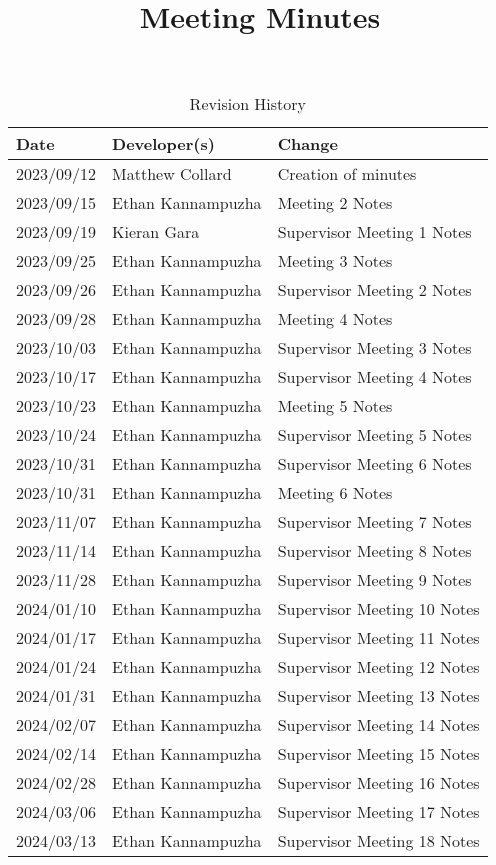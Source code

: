 \documentclass{article}
\title{Meeting Minutes\\\progname}
\author{\authname}
\date{}
\begin{document}
\maketitle

\begin{table}[hp]
\caption{Revision History} \label{TblRevisionHistory}
\begin{tabularx}{\textwidth}{llX}
\toprule
\textbf{Date} & \textbf{Developer(s)} & \textbf{Change}\\
\midrule
2023/09/12 & Matthew Collard & Creation of minutes\\
2023/09/15 & Ethan Kannampuzha & Meeting 2 Notes\\
2023/09/19 & Kieran Gara & Supervisor Meeting 1 Notes\\
2023/09/25 & Ethan Kannampuzha & Meeting 3 Notes\\
2023/09/26 & Ethan Kannampuzha & Supervisor Meeting 2 Notes\\
2023/09/28 & Ethan Kannampuzha & Meeting 4 Notes\\
2023/10/03 & Ethan Kannampuzha & Supervisor Meeting 3 Notes\\
2023/10/17 & Ethan Kannampuzha & Supervisor Meeting 4 Notes\\
2023/10/23 & Ethan Kannampuzha & Meeting 5 Notes\\
2023/10/24 & Ethan Kannampuzha & Supervisor Meeting 5 Notes\\
2023/10/31 & Ethan Kannampuzha & Supervisor Meeting 6 Notes\\
2023/10/31 & Ethan Kannampuzha & Meeting 6 Notes\\
2023/11/07 & Ethan Kannampuzha & Supervisor Meeting 7 Notes\\
2023/11/14 & Ethan Kannampuzha & Supervisor Meeting 8 Notes\\
2023/11/28 & Ethan Kannampuzha & Supervisor Meeting 9 Notes\\
2024/01/10 & Ethan Kannampuzha & Supervisor Meeting 10 Notes\\
2024/01/17 & Ethan Kannampuzha & Supervisor Meeting 11 Notes\\
2024/01/24 & Ethan Kannampuzha & Supervisor Meeting 12 Notes\\
2024/01/31 & Ethan Kannampuzha & Supervisor Meeting 13 Notes\\
2024/02/07 & Ethan Kannampuzha & Supervisor Meeting 14 Notes\\
2024/02/14 & Ethan Kannampuzha & Supervisor Meeting 15 Notes\\
2024/02/28 & Ethan Kannampuzha & Supervisor Meeting 16 Notes\\
2024/03/06 & Ethan Kannampuzha & Supervisor Meeting 17 Notes\\
2024/03/13 & Ethan Kannampuzha & Supervisor Meeting 18 Notes\\
\bottomrule
\end{tabularx}
\end{table}
\end{document}
